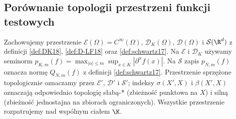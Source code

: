 \subsection{Porównanie topologii przestrzeni funkcji testowych}
\label{sec:synteza25}

\begin{definicja}
\label{def:trzy-przestrzenie25}
Zachowujemy przestrzenie $\mathcal E(\Omega)=C^\infty(\Omega)$,
$\mathcal D_K(\Omega)$, $\mathcal D(\Omega)$ i $\mathcal S(\R^d)$
z definicji \ref{def:DK18}, \ref{def:D-LF18}
oraz \ref{def:schwartz17}. Na $\mathcal E$ i $\mathcal D_K$
używamy seminorm
$p_{K,m}(f)=\max_{|\alpha|\le m}\sup_{x\in K}|\partial^\alpha f(x)|$.
Na $\mathcal S$ zapis $p_{N,m}(f)$ oznacza normę
$Q_{N,m}(f)$ z definicji \ref{def:schwartz17}.
Przestrzenie sprzężone topologicznie oznaczamy przez
$\mathcal E'$, $\mathcal D'$ i $\mathcal S'$; indeksy
$\sigma(X',X)$ i $\beta(X',X)$ oznaczają odpowiednio
topologię słabą-* (zbieżność punktowa na $X$)
i silną (zbieżność jednostajna na zbiorach ograniczonych).
Wszystkie przestrzenie rozpatrujemy nad wspólnym ciałem $\K$.
\end{definicja}

